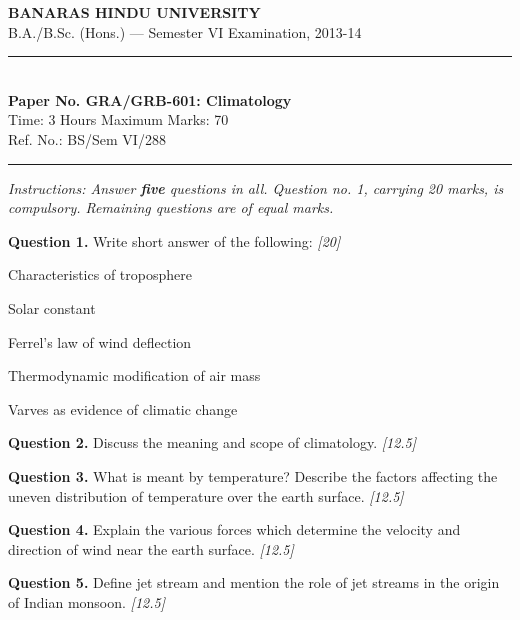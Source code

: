 \documentclass[11pt,a4paper]{article}
\newcommand{\pts}[1]{\hfill   \textit{[#1]}}
\begin{document}
\begin{center}
  {\large\bfseries BANARAS HINDU UNIVERSITY}\\[2pt]
  {\normalsize B.A./B.Sc. (Hons.) --- Semester VI Examination, 2013-14}\\[6pt]
  \rule{0.8\linewidth}{0.5pt}\\[6pt]
  {\large\bfseries Paper No. GRA/GRB-601: Climatology}\\[4pt]
  {\normalsize Time: 3 Hours \hfill Maximum Marks: 70}\\[2pt]
  {\small Ref. No.: BS/Sem VI/288}
\end{center}
\rule{\linewidth}{0.4pt}
\smallskip



\noindent   \textit{Instructions: Answer   \textbf{five} questions in all. Question no. 1, carrying 20 marks, is compulsory. Remaining questions are of equal marks.}
\bigskip




\noindent   \textbf{Question 1.} Write short answer of the following: \pts{20}

\begin{parts}
  \item Characteristics of troposphere
  \item Solar constant
  \item Ferrel's law of wind deflection
  \item Thermodynamic modification of air mass
  \item Varves as evidence of climatic change
\end{parts}

\medskip


\noindent   \textbf{Question 2.} Discuss the meaning and scope of climatology. \pts{12.5}

\medskip


\noindent   \textbf{Question 3.} What is meant by temperature? Describe the factors affecting the uneven distribution of temperature over the earth surface. \pts{12.5}

\medskip


\noindent   \textbf{Question 4.} Explain the various forces which determine the velocity and direction of wind near the earth surface. \pts{12.5}

\medskip


\noindent   \textbf{Question 5.} Define jet stream and mention the role of jet streams in the origin of Indian monsoon. \pts{12.5}

\medskip
\end{document}
